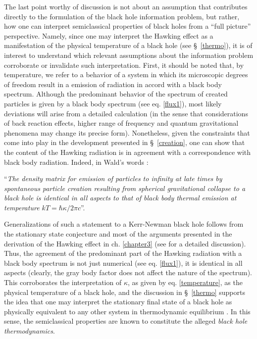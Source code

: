 \documentclass[
12pt,		%
openright,	%
twoside,  %
a4paper,			%
chapter=TITLE,		%
english,			%
french,				%
spanish,			%
brazil				%
]{USPSC-classe/USPSC}
\begin{document}
The last point worthy of discussion is not about an assumption that contributes directly to the formulation of the black hole information problem, but rather, how one can interpret semiclassical properties of black holes from a ``full picture'' perspective. Namely, since one may interpret the Hawking effect as a manifestation of the physical temperature of a black hole (see \S~\ref{thermo}), it is of interest to understand which relevant assumptions about the information problem corroborate or invalidate such interpretation. First, it should be noted that, by temperature, we refer to a behavior of a system in which its microscopic degrees of freedom result in a emission of radiation in accord with a black body spectrum. Although the predominant behavior of the spectrum of created particles is given by a black body spectrum (see eq. \ref{flux1}), most likely deviations will arise from a detailed calculation (in the sense that considerations of back reaction effects, higher range of frequency and quantum gravitational phenomena may change its precise form). Nonetheless, given the constraints that come into play in the development presented in \S~\ref{creation}, one can show that the content of the Hawking radiation is in agreement with a correspondence with black body radiation. Indeed, in Wald's words \cite{Wald1975}:

\noindent``\textit{The density matrix for emission of particles to infinity at late times by spontaneous particle creation resulting from spherical gravitational collapse to a black hole is identical in all aspects to that of black body thermal emission at temperature $kT=\hbar\kappa/2\pi c$}''.

Generalizations of such a statement to a Kerr-Newman black hole follows from the stationary state conjecture and most of the arguments presented in the derivation of the Hawking effect in ch. \ref{chapter3} (see \cite{Hawking1975, Wald1975} for a detailed discussion). Thus, the agreement of the predominant part of the Hawking radiation with a black body spectrum is not just numerical (see eq. \ref{flux1}), it is identical in all aspects (clearly, the gray body factor does not affect the nature of the spectrum). This corroborates the interpretation of $\kappa$, as given by eq. \ref{temperature}, as the physical temperature of a black hole, and the discussion in \S~\ref{thermo} supports the idea that one may interpret the stationary final state of a black hole as physically equivalent to any other system in thermodynamic equilibrium \cite{Wald2001}. In this sense, the semiclassical properties are known to constitute the alleged \textit{black hole thermodynamics}. 
\end{document}
